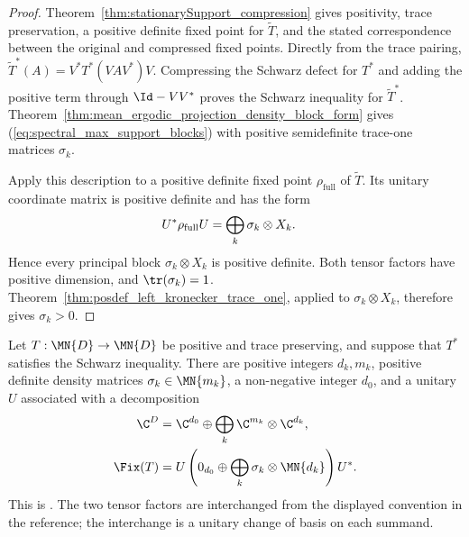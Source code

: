 \begin{proof}
    \leanok
    Theorem~\ref{thm:stationarySupport_compression} gives positivity, trace
    preservation, a positive definite fixed point for $\widetilde T$, and the
    stated correspondence between the original and compressed fixed points.
    Directly from the trace pairing,
    $\widetilde T^*(A)=V^*T^*(VAV^*)V$. Compressing the Schwarz defect for
    $T^*$ and adding the positive term through $\Id-VV^*$ proves the Schwarz
    inequality for $\widetilde T^*$.
    Theorem~\ref{thm:mean_ergodic_projection_density_block_form} gives
    (\ref{eq:spectral_max_support_blocks}) with positive semidefinite
    trace-one matrices $\sigma_k$.

    Apply this description to a positive definite fixed point
    $\rho_{\mathrm{full}}$ of $\widetilde T$. Its unitary coordinate matrix
    is positive definite and has the form
    \begin{align}
        U^*\rho_{\mathrm{full}}U
         & =\bigoplus_k\sigma_k\otimes X_k.
        \notag
    \end{align}
    Hence every principal block $\sigma_k\otimes X_k$ is positive definite.
    Both tensor factors have positive dimension, and $\tr(\sigma_k)=1$.
    Theorem~\ref{thm:posdef_left_kronecker_trace_one}, applied to
    $\sigma_k\otimes X_k$, therefore gives $\sigma_k>0$.
\end{proof}

\begin{theorem}%
    \label{thm:wolf_6_14}
    \leanok
    Let $T:\MN{D}\to\MN{D}$ be positive and trace preserving, and suppose
    that $T^*$ satisfies the Schwarz inequality. There are positive integers
    $d_k,m_k$, positive definite density matrices
    $\sigma_k\in\MN{m_k}$, a non-negative integer $d_0$, and a unitary $U$
    associated with a decomposition
    \begin{align}
        \C^D
         & =\C^{d_0}\oplus
        \bigoplus_k\C^{m_k}\otimes\C^{d_k},
        \notag                   \\
        \Fix(T)
         & =U\left(0_{d_0}\oplus
        \bigoplus_k\sigma_k\otimes\MN{d_k}\right)U^*.
        \label{eq:spectral_fixed_density_blocks}
    \end{align}
    This is \cite[Theorem~6.14 and Equation~(6.63)]{Wolf2012Quantum}.
    The two tensor factors are interchanged from the displayed convention in
    the reference; the interchange is a unitary change of basis on each
    summand.
\end{theorem}

